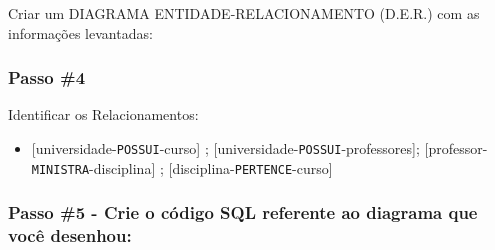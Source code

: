 \documentclass[
]{book}
\providecommand{\tightlist}{%
  \setlength{\itemsep}{0pt}\setlength{\parskip}{0pt}}
\begin{document}
Criar um DIAGRAMA ENTIDADE-RELACIONAMENTO (D.E.R.) com as informações levantadas:









\subsubsection{Passo \#4}\label{passo-4}

Identificar os Relacionamentos:

\begin{itemize}
\tightlist
\item
  {[}universidade-\texttt{POSSUI}-curso{]} ; {[}universidade-\texttt{POSSUI}-professores{]}; {[}professor-\texttt{MINISTRA}-disciplina{]} ; {[}disciplina-\texttt{PERTENCE}-curso{]}
\end{itemize}



\subsubsection{Passo \#5 - Crie o código SQL referente ao diagrama que você desenhou:}\label{passo-5---crie-o-cuxf3digo-sql-referente-ao-diagrama-que-vocuxea-desenhou}
\end{document}
